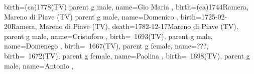 \documentclass{article}
\begin{document}
\begin{midpage}
\begin{center}
\begin{genealogypicture}
{{{{{{{{{                                    birth={(ca)1778}{(TV)}
                                }
                                parent{
                                    g{
                                        male,
                                        name={Gio Maria },
                                        birth={(ca)1744}{Ramera, Mareno di Piave (TV)}
                                    }
                                    parent{
                                        g{
                                            male,
                                            name={Domenico },
                                            birth={1725-02-20}{Ramera, Mareno di Piave (TV)},
                                            death={1782-12-17}{Mareno di Piave (TV)},
                                        }
                                        parent{
                                            g{
                                                male,
                                                name={Cristoforo },
                                                birth={~1693}{(TV)},
                                            }
                                            parent{
                                                g{
                                                    male,
                                                    name={Domenego },
                                                    birth={~1667}{(TV)},
                                                }
                                            }
                                            parent{
                                                g{
                                                    female,
                                                    name={???},
                                                    birth={~1672}{(TV)},
                                                }
                                            }
                                        }
                                        parent{
                                            g{
                                                female,
                                                name={Paolina },
                                                birth={~1698}{(TV)},
                                            }
                                            parent{
                                                g{
                                                    male,
                                                    name={Antonio },
}}}}}}}}}}}}}
\end{genealogypicture}
\end{center}
\end{midpage}
\end{document}

